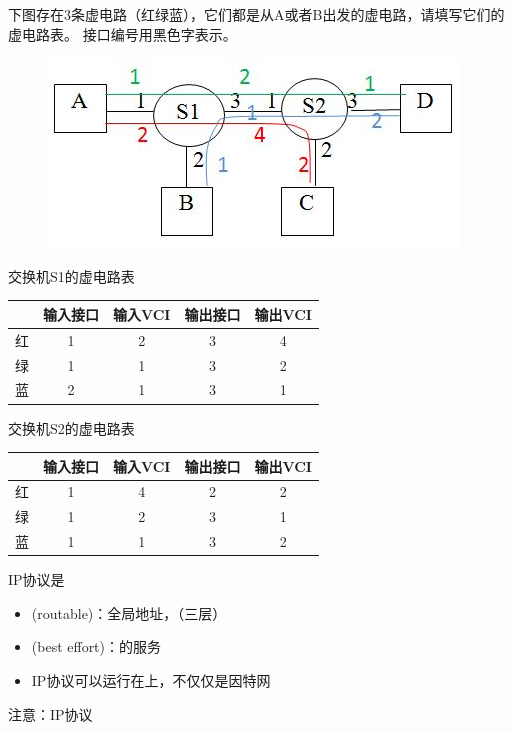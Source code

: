 \begin{example}
	下图存在3条虚电路（红绿蓝），它们都是从A或者B出发的虚电路，请填写它们的虚电路表。
	接口编号用黑色字表示。
	\begin{figure}[H]
		\centering
		\includegraphics[width=0.4\linewidth]{fig/virtual_circuit.png}
	\end{figure}
\end{example}
\begin{analysis}
交换机S1的虚电路表
\begin{center}
\begin{tabular}{ccccc}\hline
 & 输入接口 & 输入VCI & 输出接口 & 输出VCI\\\hline
红 & 1 & 2 & 3 & 4\\
绿 & 1 & 1 & 3 & 2\\
蓝 & 2 & 1 & 3 & 1\\\hline
\end{tabular}
\end{center}
交换机S2的虚电路表
\begin{center}
\begin{tabular}{ccccc}\hline
 & 输入接口 & 输入VCI & 输出接口 & 输出VCI\\\hline
红 & 1 & 4 & 2 & 2\\
绿 & 1 & 2 & 3 & 1\\
蓝 & 1 & 1 & 3 & 2\\\hline
\end{tabular}
\end{center}
\end{analysis}

\myhline
IP协议是
\begin{itemize}
\item {}(routable)：全局地址，（三层）
\item {}(best effort)：的服务
\item IP协议可以运行在上，不仅仅是因特网
\end{itemize}
注意：IP协议

